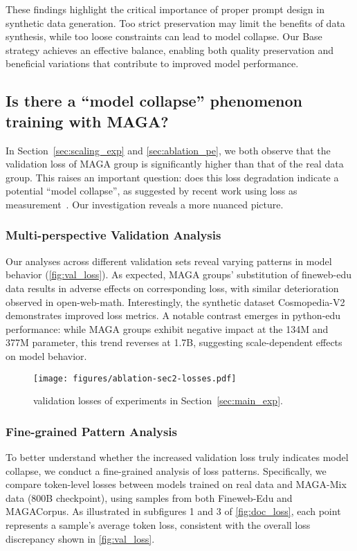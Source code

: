 These findings highlight the critical importance of proper prompt design in synthetic data generation.
Too strict preservation may limit the benefits of data synthesis,
while too loose constraints can lead to model collapse.
Our Base strategy achieves an effective balance, enabling both quality preservation and beneficial variations
that contribute to improved model performance.

\subsection{Is there a ``model collapse'' phenomenon training with MAGA?}
\label{sec:disscuss_model_collapse}
In Section~\ref{sec:scaling_exp} and \ref{sec:ablation_pe}, we both observe that the validation loss of MAGA group is significantly higher than that of the real data group.
This raises an important question: does this loss degradation indicate a potential ``model collapse'',
as suggested by recent work using loss as measurement~\citep{dohmatob2024talecollapse,dohmatob2024strongcollapse,zhu2024synthesize}.
Our investigation reveals a more nuanced picture.

\subsubsection{Multi-perspective Validation Analysis}
Our analyses across different validation sets reveal varying patterns in model behavior (\autoref{fig:val_loss}).
As expected, MAGA groups' substitution of fineweb-edu data results in adverse effects on corresponding loss, with similar deterioration observed in open-web-math.
Interestingly, the synthetic dataset Cosmopedia-V2 demonstrates improved loss metrics.
A notable contrast emerges in python-edu performance: while MAGA groups exhibit negative impact at the 134M and 377M parameter, this trend reverses at 1.7B, suggesting scale-dependent effects on model behavior.

\begin{figure*}[h]
\centering
\texttt{[image: figures/ablation-sec2-losses.pdf]}
\vspace{-2em}
\caption{validation losses of experiments in Section~\ref{sec:main_exp}.}
\label{fig:val_loss}
\end{figure*}
\vspace{-1em}

\subsubsection{Fine-grained Pattern Analysis}
To better understand whether the increased validation loss truly indicates model collapse,
we conduct a fine-grained analysis of loss patterns.
Specifically, we compare token-level losses between models trained on real data and MAGA-Mix data (800B checkpoint), using samples from both Fineweb-Edu and MAGACorpus.
As illustrated in subfigures 1 and 3 of \autoref{fig:doc_loss},
each point represents a sample's average token loss,
consistent with the overall loss discrepancy shown in \autoref{fig:val_loss}.

